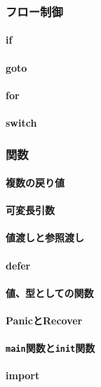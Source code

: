 
\subsubsection{フロー制御}

\paragraph{if}

\paragraph{goto}

\paragraph{for}

\paragraph{switch}

\subsubsection{関数}

\paragraph{複数の戻り値}

\paragraph{可変長引数}

\paragraph{値渡しと参照渡し}

\paragraph{defer}

\paragraph{値、型としての関数}

\paragraph{PanicとRecover}

\paragraph{\texttt{main}関数と\texttt{init}関数}

\paragraph{import}

